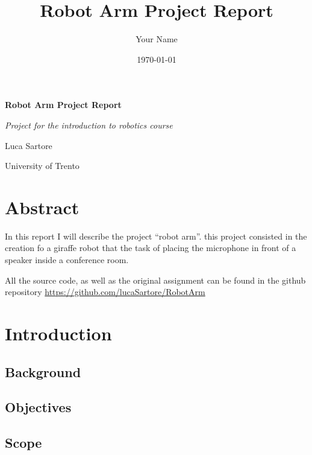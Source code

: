 \documentclass[12pt,a4paper]{article}
\title{Robot Arm Project Report}
\author{Your Name}
\date{\today}
\begin{document}
\begin{titlepage}
    \centering
    \vspace*{1cm}
    {\Huge\textbf{Robot Arm Project Report}\par}
    \vspace{2cm}
    {\Large\textit{Project for the introduction to robotics course}\par}
    \vspace{3cm}
    {\Large Luca Sartore\par}
    \vfill
    University of Trento
    \vspace{1cm}
\end{titlepage}

\tableofcontents
\newpage

\section*{Abstract}
In this report I will describe the project ``robot arm''.
this project consisted in the creation fo a giraffe robot that 
the task of placing the microphone in front of a speaker inside a conference room.

All the source code, as well as the original assignment can be found in the 
github repository \url{https://github.com/lucaSartore/RobotArm}

\section{Introduction}
\subsection{Background}
\subsection{Objectives}
\subsection{Scope}

\end{document}
